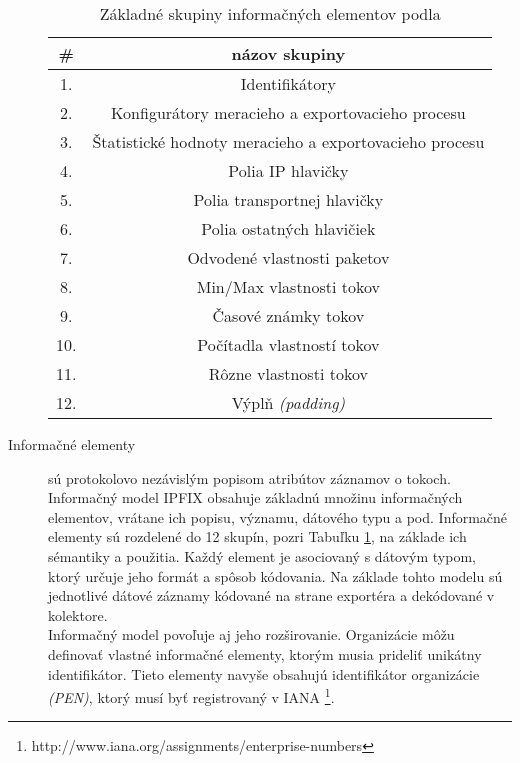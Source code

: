\begin{description}
\tabcolsep=8pt
\begin{table}[!ht]\caption{Základné skupiny informačných elementov podla \citep{rfc5102}}\label{t:ie-table}
\smallskip
\centering
\begin{tabular}{|c|c|}
\hline
\textbf{\#} & \textbf{názov skupiny} \\ \hline
1. & Identifikátory \\ \hline
2. & Konfigurátory meracieho a exportovacieho procesu \\ \hline
3. & Štatistické hodnoty meracieho a exportovacieho procesu \\ \hline
4. & Polia IP hlavičky \\ \hline
5. & Polia transportnej hlavičky \\ \hline
6. & Polia ostatných hlavičiek \\ \hline
7. & Odvodené vlastnosti paketov \\ \hline
8. & Min/Max vlastnosti tokov \\ \hline
9. & Časové známky tokov \\ \hline
10. & Počítadla vlastností tokov \\ \hline
11. & Rôzne vlastnosti tokov \\ \hline
12. & Výplň \emph{(padding)} \\ \hline
\end{tabular}
\end{table}

  \item[Informačné elementy] sú protokolovo nezávislým popisom atribútov záznamov o tokoch. 
Informačný model IPFIX \citep{rfc5102} obsahuje základnú množinu informačných elementov, vrátane ich
popisu, významu, dátového typu a pod. Informačné elementy sú rozdelené do 12 skupín, pozri Tabuľku \ref{t:ie-table},
na základe ich sémantiky a použitia. Každý element je asociovaný s dátovým typom, ktorý určuje jeho 
formát a spôsob kódovania.
Na základe tohto modelu sú jednotlivé dátové záznamy kódované na strane exportéra a dekódované 
v kolektore.\\
Informačný model povoľuje aj jeho rozširovanie. Organizácie môžu definovať vlastné informačné
elementy, ktorým musia prideliť unikátny identifikátor. 
Tieto elementy navyše obsahujú identifikátor organizácie \emph{(PEN)}, ktorý musí byť registrovaný v IANA
\footnote{http://www.iana.org/assignments/enterprise-numbers}.
\end{description}



